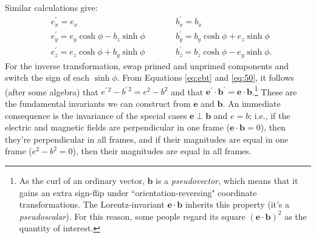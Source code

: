 \documentclass[12pt]{article}
\renewcommand{\vv}[1]{\mathbf{#1}}
\begin{document}
Similar calculations give:
\begin{equation}\label{eq:ebt}
\begin{aligned}
&e^\prime_x = e_x  \qquad \qquad& &b^\prime_x = b_x  \\
&e^\prime_y = e_y \cosh{\phi} - b_z \sinh{\phi}  \qquad& &b^\prime_y = b_y \cosh{\phi} + e_z \sinh{\phi} \\
&e^\prime_z = e_z \cosh{\phi} + b_y \sinh{\phi}  \qquad& &b^\prime_z = b_z \cosh{\phi} - e_y \sinh{\phi} .
\end{aligned}
\end{equation}
For the inverse transformation, swap primed and unprimed components and switch the sign of each $\sinh{\phi}$. From Equations \ref{eq:ebt} and \ref{eq:50}, it follows (after some algebra) that  ${e^{\prime \, 2} - b^{\prime \, 2} = e^2 - b^2}$ and that $\vv e^\prime \cdot \vv b^\prime = \vv e \cdot \vv b$.\footnote{\label{fn:ps}As the curl of an ordinary vector, $\vv b$ is a \emph{pseudovector}, which means that it gains an extra sign-flip under ``orientation-reversing" coordinate transformations. The Lorentz-invariant $\vv e \cdot \vv b$ inherits this property (it's a \emph{pseudoscalar}). For this reason, some people regard its square $(\vv e \cdot \vv b)^2$ as the quantity of interest.} These are the fundamental invariants we can construct from $\vv e$ and $\vv b$. An immediate consequence is the invariance of the special cases $\vv e \perp \vv b$ and $e = b$; i.e., if the electric and magnetic fields are perpendicular in one frame ($\vv e \cdot \vv b = 0$), then they're perpendicular in all frames, and if their magnitudes are equal in one frame ($e^2 - b^2 = 0$), then their magnitudes are equal in all frames.
\end{document}

